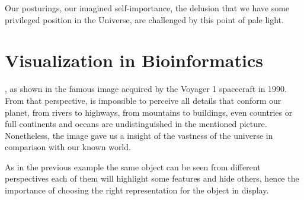 \begin{savequote}[75mm] 
Our posturings, our imagined self-importance, the delusion that we have some privileged position in the Universe, are challenged by this point of pale light.
\end{savequote}

\chapter{Visualization in Bioinformatics}

, as shown in the famous image acquired by the Voyager 1 spacecraft in 1990. From that perspective, is impossible to perceive  all details that conform our planet, from rivers to highways, from mountains to buildings, even countries or full continents and oceans are undistinguished in the mentioned picture. Nonetheless, the image gave us a insight of the vastness of the universe in comparison with our known world.

As in the previous example the same object can be seen from different perspectives each of them will highlight some features and hide others, hence the importance of choosing the right representation for the object in display.



